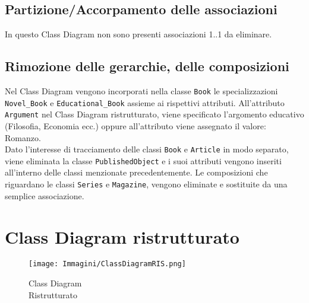 \subsection{Partizione/Accorpamento delle associazioni}
In questo Class Diagram non sono presenti associazioni 1..1 da eliminare.
\subsection{Rimozione delle gerarchie, delle composizioni}
Nel Class Diagram vengono incorporati nella classe \texttt{Book} le specializzazioni \texttt{Novel\_Book} e \texttt{Educational\_Book} assieme ai rispettivi attributi. All'attributo \texttt{Argument} nel Class Diagram ristrutturato, viene specificato l'argomento educativo (Filosofia, Economia ecc.) oppure all'attributo viene assegnato il valore: Romanzo.\\
Dato l'interesse di tracciamento delle classi \texttt{Book} e \texttt{Article} in modo separato, viene eliminata la classe \texttt{PublishedObject} e i suoi attributi vengono inseriti all'interno delle classi menzionate precedentemente.
Le composizioni che riguardano le classi \texttt{Series} e \texttt{Magazine}, vengono eliminate e sostituite da una semplice associazione.
\newpage
\section{Class Diagram ristrutturato}

\begin{figure}[hbt]
\centering
\texttt{[image: Immagini/ClassDiagramRIS.png]}
\caption{Class Diagram \\ Ristrutturato}
\label{fig:ClassDiagramRIS}
\end{figure}

